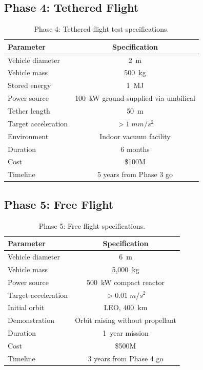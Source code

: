 \documentclass[twocolumn,prl,superscriptaddress,nofootinbib,longbibliography,floatfix]{revtex4-2}
\begin{document}
\subsection{Phase 4: Tethered Flight}

\begin{table}[h]
\centering
\caption{Phase 4: Tethered flight test specifications.}
\label{tab:phase4}
\begin{ruledtabular}
\begin{tabular}{lc}
Parameter & Specification \\
\hline
Vehicle diameter & 2~m \\
Vehicle mass & 500~kg \\
Stored energy & 1~MJ \\
Power source & 100~kW ground-supplied via umbilical \\
Tether length & 50~m \\
Target acceleration & $> 1\;\si{mm/s^2}$ \\
Environment & Indoor vacuum facility \\
Duration & 6 months \\
Cost & \$100M \\
Timeline & 5 years from Phase 3 go \\
\end{tabular}
\end{ruledtabular}
\end{table}

\subsection{Phase 5: Free Flight}

\begin{table}[h]
\centering
\caption{Phase 5: Free flight specifications.}
\label{tab:phase5}
\begin{ruledtabular}
\begin{tabular}{lc}
Parameter & Specification \\
\hline
Vehicle diameter & 6~m \\
Vehicle mass & 5{,}000~kg \\
Power source & 500~kW compact reactor \\
Target acceleration & $> 0.01\;\si{m/s^2}$ \\
Initial orbit & LEO, 400~km \\
Demonstration & Orbit raising without propellant \\
Duration & 1~year mission \\
Cost & \$500M \\
Timeline & 3 years from Phase 4 go \\
\end{tabular}
\end{ruledtabular}
\end{table}
\end{document}
